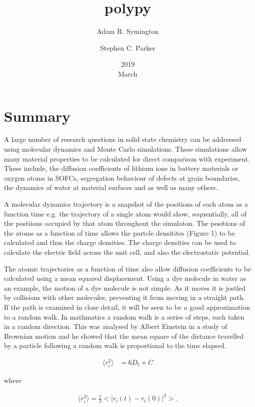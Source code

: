 \documentclass[journal=jacsat,manuscript=article]{achemso}
\title{polypy}
\author{Adam R. Symington}
\affiliation{Department of Chemistry, University of Bath, Claverton Down, Bath BA2 7AY, UK}
\author{Stephen C. Parker}
\affiliation{Department of Chemistry, University of Bath, Claverton Down, Bath BA2 7AY, UK}
\date{2019\\ March}
\begin{document}

\section{Summary}
A large number of research questions in solid state chemistry can be addressed using molecular dynamics and Monte Carlo simulations. These simulations allow many material properties to be calculated for direct comparison with experiment.  These include, the diffusion coefficients of lithium ions in battery materials or oxygen atoms in SOFCs, segregation behaviour of defects at grain boundaries, the dynamics of water at material surfaces and as well as many others.

A molecular dynamics trajectory is a snapshot of the positions of each atom as a function time e.g. the trajectory of a single atom would show, sequentially, all of the postiions occupied by that atom throughout the simulaton. The positions of the atoms as a function of time allows the partcle densitites (Figure 1) to be calculated and thus the charge densities. The charge densities can be used to calculate the electric field across the unit cell, and also the electrostatic potential.   

The atomic trajectories as a function of time also allow diffusion coefficients to be calculated using a mean squared displacement. Using a dye molecule in water as an example, the motion of a dye molecule is not simple. As it moves it is jostled by collisions with other molecules, preventing it from moving in a straight path. If the path is examined in close detail, it will be seen to be a good approximation to a random walk. In mathmatics a random walk is a series of steps, each taken in a random direction. This was analysed by Albert Einstein in a study of Brownian motion and he showed that the mean square of the distance travelled by a particle following a random walk is proportional to the time elapsed. 

\begin{align}
\Big \langle r_{i}^{2} \big \rangle & = 6 D_t + C 
\end{align}


where 

\begin{align}
\Big \langle r_{i}^{2} \big \rangle = \frac{1}{3} \Big< | r_{i}(t) - r_{i}(0) |^2 \Big>.
\end{align}
\end{document}
